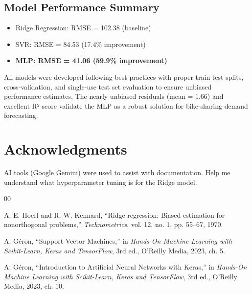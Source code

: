 \documentclass[conference]{IEEEtran}
\begin{document}
\subsection{Model Performance Summary}
\begin{itemize}
    \item Ridge Regression: RMSE = 102.38 (baseline)
    \item SVR: RMSE = 84.53 (17.4\% improvement)
    \item \textbf{MLP: RMSE = 41.06 (59.9\% improvement)}
\end{itemize}

All models were developed following best practices with proper train-test splits, cross-validation, and single-use test set evaluation to ensure unbiased performance estimates. The nearly unbiased residuals (mean = 1.66) and excellent R² score validate the MLP as a robust solution for bike-sharing demand forecasting.

\section*{Acknowledgments}

AI tools (Google Gemini) were used to assist with documentation. Help me understand what hyperparameter tuning is for the Ridge model.


\begin{thebibliography}{00}

A. E. Hoerl and R. W. Kennard, ``Ridge regression: Biased estimation for nonorthogonal problems,'' \textit{Technometrics}, vol. 12, no. 1, pp. 55--67, 1970.

A. Géron, ``Support Vector Machines,'' in \textit{Hands-On Machine Learning with Scikit-Learn, Keras and TensorFlow}, 3rd ed., O'Reilly Media, 2023, ch. 5.

A. Géron, ``Introduction to Artificial Neural Networks with Keras,'' in \textit{Hands-On Machine Learning with Scikit-Learn, Keras and TensorFlow}, 3rd ed., O'Reilly Media, 2023, ch. 10.

\end{thebibliography}
\end{document}

